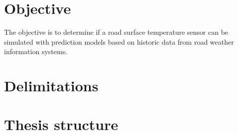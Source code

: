 
\section{Objective}
	The objective is to determine if a road surface temperature sensor can be simulated with prediction models based on historic data from road weather information systems.
\section{Delimitations}

\section{Thesis structure}
